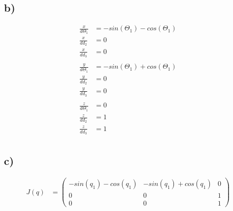 \subsection{b)}\label{ass5_t4b}

\begin{align*}
\frac{x}{d \Theta_1} &= -sin(\Theta_1) - cos(\Theta_1)\\
\frac{x}{d d_2} &= 0 \\
\frac{x}{d d_3} &= 0 \\
\\
\frac{y}{d \Theta_1} &= -sin(\Theta_1) + cos(\Theta_1) \\
\frac{y}{d d_2} &= 0 \\
\frac{y}{d d_3} &= 0 \\
\\
\frac{z}{d \Theta_1} &= 0 \\
\frac{z}{d d_2} &= 1 \\
\frac{z}{d d_3} &= 1 \\
\end{align*}

\subsection{c)}\label{ass5_t4a}

\begin{align*}
J(q) &= \left( \begin{matrix} -sin(q_1)-cos(q_1) & -sin(q_1)+cos(q_1) & 0 \\ 0 & 0 & 1 \\ 0 & 0 & 1 \end{matrix} \right)
\end{align*}
